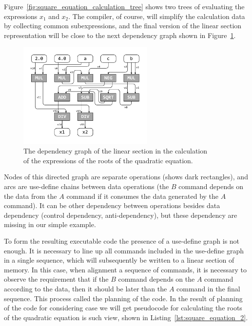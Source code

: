 \documentclass[
11pt,%
tightenlines,%
twoside,%
onecolumn,%
nofloats,%
nobibnotes,%
nofootinbib,%
superscriptaddress,%
noshowpacs,%
centertags]%
{revtex4}
\begin{document}
Figure~\ref{fig:square_equation_calculation_tree} shows two trees of evaluating the expressions $x_1$ and $x_2$. The compiler, of course, will simplify the calculation data by collecting common subexpressions, and the final version of the linear section representation will be close to the next dependency graph shown in Figure~\ref{fig:def_use}.

\begin{figure}[h]
\setcaptionmargin{5mm}
\onelinecaptionsfalse %
\includegraphics[width=0.60\textwidth]{pics/def_use.pdf}
\caption{The dependency graph of the linear section in the calculation \\ of the expressions of the roots of the quadratic equation.}\label{fig:def_use}
\end{figure}

Nodes of this directed graph are separate operations (shows dark rectangles), and arcs are use-define chains between data operations (the $B$ command depends on the data from the $A$ command if it consumes the data generated by the $A$ command). It can be other dependency between operations besides data dependency (control dependency, anti-dependency), but these dependency are missing in our simple example.

To form the resulting executable code the presence of a use-define graph is not enough. It is necessary to line up all commands included in the use-define graph in a single sequence, which will subsequently be written to a linear section of memory. In this case, when alignment a sequence of commands, it is necessary to observe the requirement that if the $B$ command depends on the $A$ command according to the data, then it should be later than the $A$ command in the final sequence. This process called the planning of the code\cite{Aho}.
In the result of planning of the code for considering case we will get pseudocode for calculating the roots of the quadratic equation is such view, shown in Listing~\ref{lst:square_equation_2}.
\end{document}
